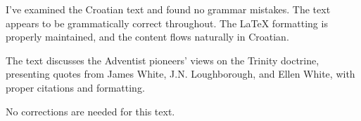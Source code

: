 I've examined the Croatian text and found no grammar mistakes. The text appears to be grammatically correct throughout. The LaTeX formatting is properly maintained, and the content flows naturally in Croatian.

The text discusses the Adventist pioneers’ views on the Trinity doctrine, presenting quotes from James White, J.N. Loughborough, and Ellen White, with proper citations and formatting.

No corrections are needed for this text.